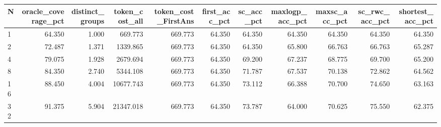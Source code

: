 \begin{tabular}{lrrrrrrrrrr}
\toprule
N & oracle\_coverage\_pct & distinct\_groups & token\_cost\_all & token\_cost\_FirstAns & first\_acc\_pct & sc\_acc\_pct & maxlogp\_acc\_pct & maxsc\_acc\_pct & sc\_rwc\_acc\_pct & shortest\_acc\_pct \\
\midrule
1 & 64.350 & 1.000 & 669.773 & 669.773 & 64.350 & 64.350 & 64.350 & 64.350 & 64.350 & 64.350 \\
2 & 72.487 & 1.371 & 1339.865 & 669.773 & 64.350 & 64.350 & 65.800 & 66.763 & 66.763 & 65.287 \\
4 & 79.075 & 1.928 & 2679.694 & 669.773 & 64.350 & 69.200 & 67.237 & 68.775 & 69.700 & 65.200 \\
8 & 84.350 & 2.740 & 5344.108 & 669.773 & 64.350 & 71.787 & 67.537 & 70.138 & 72.862 & 64.562 \\
16 & 88.450 & 4.004 & 10677.743 & 669.773 & 64.350 & 73.112 & 66.388 & 70.700 & 74.650 & 63.163 \\
32 & 91.375 & 5.904 & 21347.018 & 669.773 & 64.350 & 73.787 & 64.000 & 70.625 & 75.550 & 62.375 \\
\bottomrule
\end{tabular}
